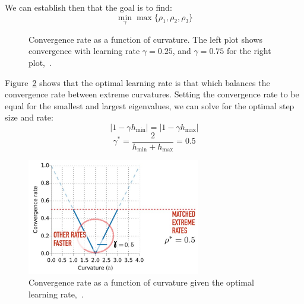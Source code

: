 \documentclass{article}
\begin{document}
We can establish then that the goal is to find:
\begin{equation}
\min_\gamma \max \{\rho_1, \rho_2, \rho_3\}
\end{equation}

\begin{figure}[H]%
\centering
{}%
\qquad
{}%
\caption{Convergence rate as a function of curvature. The left plot shows convergence with learning rate $\gamma = 0.25$, and $\gamma = 0.75$ for the right plot,~\cite{mitliagkas2019interesting}.}
\label{fig:multivar_conv}
\end{figure}

Figure~\ref{fig:optimal_alpha} shows that the optimal learning rate is that which balances the convergence rate between extreme curvatures. Setting the convergence rate to be equal for the smallest and largest eigenvalues, we can solve for the optimal step size and rate:
\begin{equation}
|1 - \gamma h_{\min}| = |1 - \gamma h_{\max}|
\end{equation}
\begin{equation}
\gamma^* = \frac{2}{h_{\min} + h_{\max}} = 0.5
\end{equation}

\begin{figure}[H]%
\centering
\includegraphics[height=2in]{GD_optimal_lr.pdf}
\caption{Convergence rate as a function of curvature given the optimal learning rate,~\cite{mitliagkas2019interesting}.}
\label{fig:optimal_alpha}
\end{figure}
\end{document}
